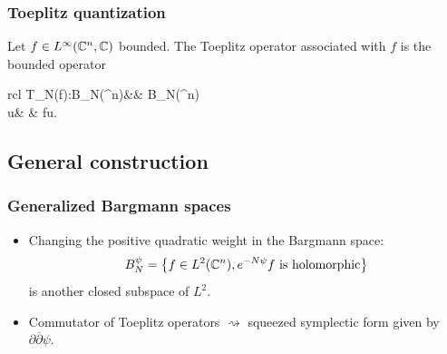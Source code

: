 \documentclass[mathserif]{beamer}
\begin{document}
\begin{frame}
  \frametitle{Toeplitz quantization}
  Let $f\in L^{\infty}(\mathbb{C}^n,\mathbb{C})$ bounded. The Toeplitz operator associated
  with $f$ is the bounded operator
\begin{center}
\begin{array}{rcl}
 		T_N(f):B_N(\C^n)&\to & B_N(\C^n)\\
		u& \mapsto& fu\uncover<2->{)}.
 		\end{array}
\end{center}

\vfill


\end{frame}




\subsection{General construction}

\begin{frame}\frametitle{Generalized Bargmann spaces}
  \begin{itemize}
    \item Changing the positive quadratic weight in the Bargmann space:
  \[
    B_N^{\psi}=\left\{f\in L^2(\mathbb{C}^n), e^{-N\psi}f \text{ is
        holomorphic}\right\}
  \]
  is another closed subspace of $L^2$.

  \item<2-> Commutator of Toeplitz operators $\rightsquigarrow$
    squeezed symplectic form given by
    $\partial\overline{\partial}\psi$.
  \end{itemize}

  \vfill
  

  \vfill

\end{frame}
\end{document}

